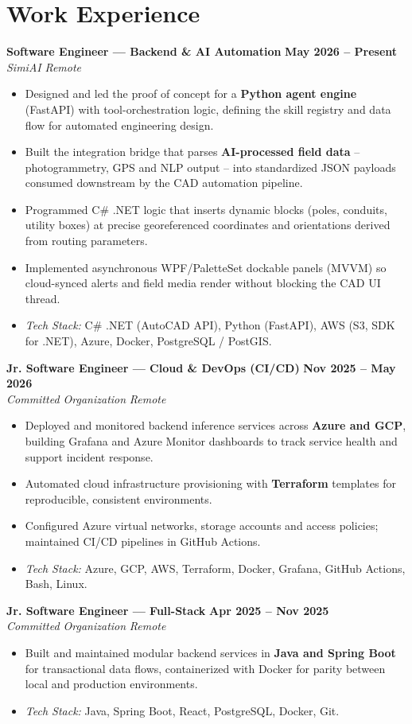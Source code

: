 \documentclass[11pt,letterpaper]{article}
\newcommand{\cventry}[4]{%
  \textbf{#1} \hfill \textbf{#2}\\
  \textit{#3} \hfill \textit{#4}\par\nobreak\vspace{1pt}%
}
\begin{document}
\section{Work Experience}

\cventry{Software Engineer --- Backend \& AI Automation}{May 2026 -- Present}{SimiAI}{Remote}
\begin{itemize}
  \item Designed and led the proof of concept for a \textbf{Python agent engine} (FastAPI) with tool-orchestration logic, defining the skill registry and data flow for automated engineering design.
  \item Built the integration bridge that parses \textbf{AI-processed field data} -- photogrammetry, GPS and NLP output -- into standardized JSON payloads consumed downstream by the CAD automation pipeline.
  \item Programmed C\# .NET logic that inserts dynamic blocks (poles, conduits, utility boxes) at precise georeferenced coordinates and orientations derived from routing parameters.
  \item Implemented asynchronous WPF/PaletteSet dockable panels (MVVM) so cloud-synced alerts and field media render without blocking the CAD UI thread.
  \item \textit{Tech Stack:} C\# .NET (AutoCAD API), Python (FastAPI), AWS (S3, SDK for .NET), Azure, Docker, PostgreSQL / PostGIS.
\end{itemize}

\cventry{Jr. Software Engineer --- Cloud \& DevOps (CI/CD)}{Nov 2025 -- May 2026}{Committed Organization}{Remote}
\begin{itemize}
  \item Deployed and monitored backend inference services across \textbf{Azure and GCP}, building Grafana and Azure Monitor dashboards to track service health and support incident response.
  \item Automated cloud infrastructure provisioning with \textbf{Terraform} templates for reproducible, consistent environments.
  \item Configured Azure virtual networks, storage accounts and access policies; maintained CI/CD pipelines in GitHub Actions.
  \item \textit{Tech Stack:} Azure, GCP, AWS, Terraform, Docker, Grafana, GitHub Actions, Bash, Linux.
\end{itemize}

\cventry{Jr. Software Engineer --- Full-Stack}{Apr 2025 -- Nov 2025}{Committed Organization}{Remote}
\begin{itemize}
  \item Built and maintained modular backend services in \textbf{Java and Spring Boot} for transactional data flows, containerized with Docker for parity between local and production environments.
  \item \textit{Tech Stack:} Java, Spring Boot, React, PostgreSQL, Docker, Git.
\end{itemize}
\end{document}
